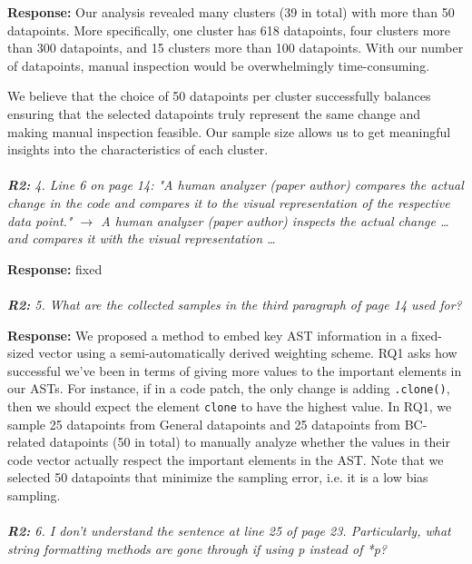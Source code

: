 \documentclass{article}
\begin{document}
\vspace*{1em} \noindent \textbf{Response:} Our analysis revealed many clusters (39 in total) with more than 50 datapoints. More specifically, one cluster has 618 datapoints, four clusters more than 300 datapoints, and 15 clusters more than 100 datapoints. With our number of datapoints, manual inspection would be overwhelmingly time-consuming.

We believe that the choice of 50 datapoints per cluster successfully balances ensuring that the selected datapoints truly represent the same change and making manual inspection feasible. Our sample size allows us to get meaningful insights into the characteristics of each cluster. \\ \\

\vspace*{1em} \noindent \textit{\textbf{R2:} 4. Line 6 on page 14: "A human analyzer (paper author) compares the actual change in the code and compares it to the visual representation of the respective data point." $\rightarrow$ A human analyzer (paper author) inspects the actual change … and compares it with the visual representation …}

\vspace*{1em} \noindent \textbf{Response:} fixed \\ \\

\vspace*{1em} \noindent \textit{\textbf{R2:} 5. What are the collected samples in the third paragraph of page 14 used for?}

\vspace*{1em} \noindent \textbf{Response:} We proposed a method to embed key AST information in a fixed-sized vector using a semi-automatically derived weighting scheme. RQ1 asks how successful we've been in terms of giving more values to the important elements in our ASTs. For instance, if in a code patch, the only change is adding \verb+.clone()+, then we should expect the element \verb+clone+ to have the highest value. In RQ1, we sample 25 datapoints from General datapoints and 25 datapoints from BC-related datapoints (50 in total) to manually analyze whether the values in their code vector actually respect the important elements in the AST. Note that we selected 50 datapoints that minimize the sampling error, i.e. it is a low bias sampling. \\ \\

\vspace*{1em} \noindent \textit{\textbf{R2:} 6. I don't understand the sentence at line 25 of page 23. Particularly, what string formatting methods are gone through if using p instead of *p?}
\end{document}
